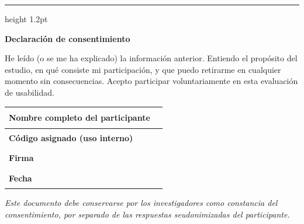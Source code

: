 \documentclass[11pt,a4paper]{article}
\newcommand{\lineac}{\rule[0.4ex]{\dimexpr\linewidth-2.5mm\relax}{0.4pt}}
\begin{document}
\vspace{2mm}
{\color{dorado}\hrule height 1.2pt}

\vspace{3.5mm}
{\fontsize{12}{14}\selectfont\bfseries\color{verdeOsc}%
 Declaraci\'on de consentimiento\par}

\vspace{2mm}
He le\'ido (o se me ha explicado) la informaci\'on anterior. Entiendo el prop\'osito del estudio,
en qu\'e consiste mi participaci\'on, y que puedo retirarme en cualquier momento sin
consecuencias. Acepto participar voluntariamente en esta evaluaci\'on de usabilidad.

\vspace{3.5mm}

\begingroup
\renewcommand{\arraystretch}{1.9}
\begin{tabular}{|m{58mm}|m{110.2mm}|}
  \hline
  \rowcolor{grisClaro}\textbf{\color{verdeOsc}\hspace*{2.5mm}%
    Nombre completo del participante} &
  \hspace*{2.5mm}\lineac \\ \hline
  \rowcolor{grisClaro}\textbf{\color{verdeOsc}\hspace*{2.5mm}%
    C\'odigo asignado (uso interno)} &
  \hspace*{2.5mm}\lineac \\ \hline
  \rowcolor{grisClaro}\textbf{\color{verdeOsc}\hspace*{2.5mm}Firma} &
  \hspace*{2.5mm}\lineac \\ \hline
  \rowcolor{grisClaro}\textbf{\color{verdeOsc}\hspace*{2.5mm}Fecha} &
  \hspace*{2.5mm}\lineac \\ \hline
\end{tabular}
\endgroup

\vspace{2.5mm}
{\fontsize{8}{9.8}\selectfont\itshape\color{gris}%
 Este documento debe conservarse por los investigadores como constancia del consentimiento, por
 separado de las respuestas seudonimizadas del participante.\par}
\end{document}
